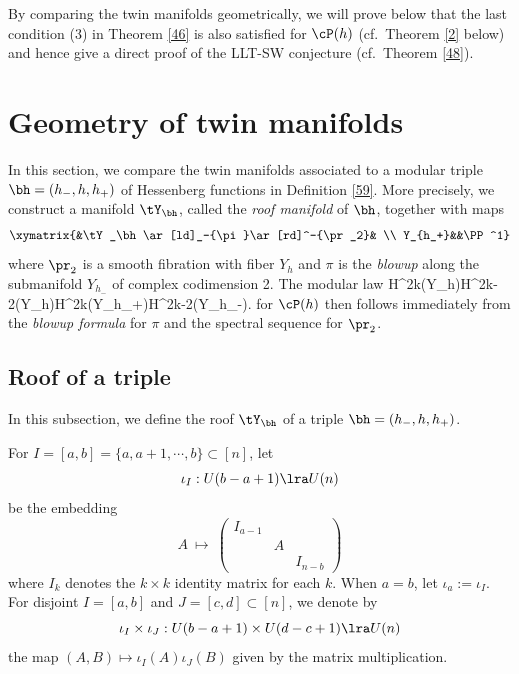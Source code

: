 By comparing the twin manifolds geometrically, 
we will prove below that the last condition (3) in Theorem \ref{46} is also satisfied for $\cP(h)$ (cf.~Theorem \ref{2} below) and hence give a direct proof of the LLT-SW conjecture (cf.~Theorem \ref{48}). 

\section{Geometry of  twin manifolds}\label{3}
In this section, we compare the twin manifolds associated to a modular triple $\bh=(h_-,h,h_+)$ of Hessenberg functions in Definition \ref{59}. 
More precisely, we construct a manifold $\tY_\bh$, called the \emph{roof manifold} of $\bh$, together with maps
$$\xymatrix{&\tY_\bh \ar[ld]_-{\pi}\ar[rd]^-{\pr_2}& \\ Y_{h_+}&&\PP^1}$$
where $\pr_2$ is a smooth fibration with fiber $Y_h$ and $\pi$ is the \emph{blowup} along the submanifold $Y_{h_-}$ of complex codimension 2. 
The modular law  
\beq\label{n30}
H^{2k}(Y_h)\oplus H^{2k-2}(Y_h)\cong H^{2k}(Y_{h_+})\oplus H^{2k-2}(Y_{h_-}).\eeq
for $\cP(h)$ then follows immediately from the \emph{blowup formula} for $\pi$  and the spectral sequence for $\pr_2$.  

\subsection{Roof of a triple} 

In this subsection, we define the roof $\tY_\bh$ of a triple $\bh=(h_-,h,h_+)$. 

For $I=[a,b]=\{a,a+1,\cdots,b\} \subset [n]$, let
\[\iota_I:U(b-a+1)\lra U(n)\]
be the embedding
\[A~\mapsto ~\begin{pmatrix}
	I_{a-1} &&\\&A&\\&&I_{n-b}
\end{pmatrix}\]
where $I_k$ denotes the $k\times k$ identity matrix for each $k$. When $a=b$, let $\iota_a:=\iota_I$. For disjoint $I=[a,b]$ and $J=[c,d]\subset [n]$, we denote by
\[\iota_I\times \iota_J:U(b-a+1)\times U(d-c+1)\lra U(n)\]
the map $(A,B)\mapsto \iota_I(A) \iota_J(B)$ given by the matrix multiplication.

